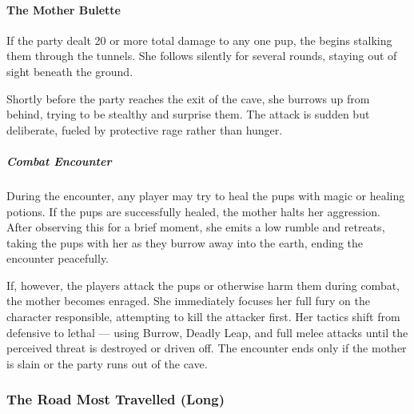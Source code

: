 \paragraph*{The Mother Bulette}
{\entryfont If the party dealt 20 or more total damage to any one pup, the \hyperref[monster:Bulette]{} begins stalking them through the tunnels. She follows silently for several rounds, staying out of sight beneath the ground.

Shortly before the party reaches the exit of the cave, she burrows up from behind, trying to be stealthy and surprise them. The attack is sudden but deliberate, fueled by protective rage rather than hunger.}
\subparagraph*{Combat Encounter}
{\entryfont During the encounter, any player may try to heal the pups with magic or healing potions. If the pups are successfully healed, the mother halts her aggression. After observing this for a brief moment, she emits a low rumble and retreats, taking the pups with her as they burrow away into the earth, ending the encounter peacefully.

If, however, the players attack the pups or otherwise harm them during combat, the mother becomes enraged. She immediately focuses her full fury on the character responsible, attempting to kill the attacker first. Her tactics shift from defensive to lethal — using Burrow, Deadly Leap, and full melee attacks until the perceived threat is destroyed or driven off. The encounter ends only if the mother is slain or the party runs out of the cave.}
\vfill\eject
\subsubsection*{The Road Most Travelled (Long)}
